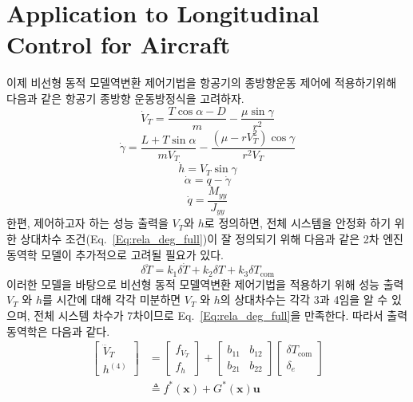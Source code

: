 \documentclass[a4paper, 12pt]{report}
\begin{document}
	\section{Application to Longitudinal Control for Aircraft}
	
	이제 비선형 동적 모델역변환 제어기법을 항공기의 종방향운동 제어에 적용하기위해 다음과 같은 항공기 종방향 운동방정식을 고려하자.
	\begin{equation}
		\dot{V}_{T} = \frac{T\cos{\alpha}-D}{m} - \frac{\mu\sin{\gamma}}{r^{2}}
	\end{equation}
	\begin{equation}
		\dot{\gamma} = \frac{L+T\sin{\alpha}}{mV_{T}} - \frac{(\mu-rV_{T}^{2})\cos{\gamma}}{r^{2}V_{T}}
	\end{equation}
	\begin{equation}
		\dot{h} = V_{T}\sin{\gamma}
	\end{equation}
	\begin{equation}
		\dot{\alpha} = q-\dot{\gamma}
	\end{equation}
	\begin{equation}
		\dot{q} = \frac{M_{yy}}{J_{yy}}
	\end{equation}
	한편, 제어하고자 하는 성능 출력을 $V_{T}$와 $h$로 정의하면, 전체 시스템을 안정화 하기 위한 상대차수 조건(Eq.~\eqref{Eq:rela_deg_full})이 잘 정의되기 위해 다음과 같은 2차 엔진 동역학 모델이 추가적으로 고려될 필요가 있다.
	\begin{equation}
		\delta\ddot{T} = k_{1}\delta\dot{T} + k_{2}\delta T + k_{3}\delta T_{\text{com}}
	\end{equation}
	이러한 모델을 바탕으로 비선형 동적 모델역변환 제어기법을 적용하기 위해 성능 출력 $V_{T}$ 와 $h$를 시간에 대해 각각 미분하면 $V_{T}$ 와 $h$의 상대차수는 각각 3과 4임을 알 수 있으며, 전체 시스템 차수가 7차이므로 Eq.~\eqref{Eq:rela_deg_full}을 만족한다. 따라서 출력 동역학은 다음과 같다.
	\begin{equation}
		\begin{split}
			\begin{bmatrix}
				\dddot{V}_{T} \\
				h^{(4)}
			\end{bmatrix}
			&=
			\begin{bmatrix}
				f_{V_{T}} \\
				f_{h}
			\end{bmatrix}
			+
			\begin{bmatrix}
				b_{11} & b_{12} \\
				b_{21} & b_{22}
			\end{bmatrix}
			\begin{bmatrix}
				\delta T_{\text{com}}\\
				\delta_{e}
			\end{bmatrix}
			\\
			&\triangleq f^{*}(\mathbf{x}) + G^{*}(\mathbf{x})\mathbf{u}
		\end{split}
	\end{equation}
\end{document}
